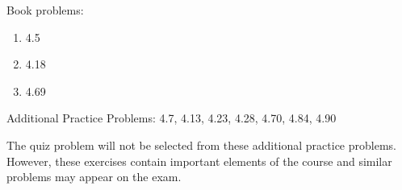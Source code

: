 
Book problems:
\begin{enumerate}
  \item 4.5
  \item 4.18
  \item 4.69
\end{enumerate}

Additional Practice Problems: 4.7, 4.13, 4.23, 4.28, 4.70, 4.84, 4.90

\noindent The quiz problem will not be selected from these additional practice problems.  However, these exercises contain important elements of the course and similar problems may appear on the exam.

\iftoggle{flagSoln}{%
\vspace{.5cm}
\rule{\textwidth}{.4pt}
\vspace{.5cm}
\textbf{Solution:}
\begin{enumerate}
	\item[4.5] (a) $34.0 kN$ up (b) $4.96 kN$ up
	\item[4.18] 230 lb
	\item[4.69] (a) 499 N (b) 457 N $26.6^\circ$ from the horizontal pointing up and to the left
\end{enumerate}
}{%
}%
